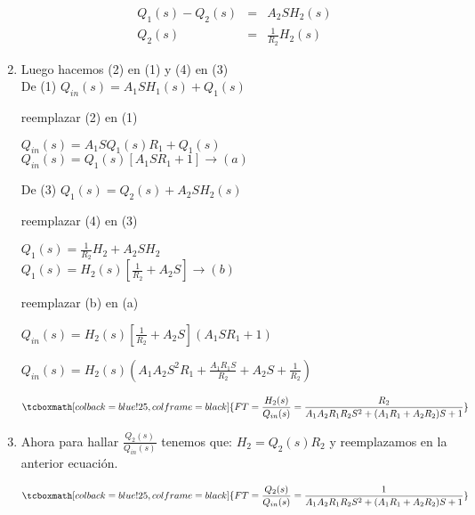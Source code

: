 \documentclass[12pt]{article}
\begin{document}
\begin{enumerate}
    \begin{eqnarray}
      Q_{1}(s) - Q_{2}(s) &=& A_{2}SH_{2}(s) \\[2mm]
      Q_{2}(s) &=& \frac{1}{R_{2}}H_{2}(s)
    \end{eqnarray}

  \item Luego hacemos (2) en (1) y (4) en (3) \\

    De (1) \hspace{5mm} \(\displaystyle Q_{in}(s)=A_{1}SH_{1}(s)+Q_{1}(s)\)

    reemplazar (2) en (1)

   \(\displaystyle Q_{in}(s)=A_{1}SQ_{1}(s)R_{1}+Q_{1}(s)\)\\

   \(\displaystyle Q_{in}(s)=Q_{1}(s)[A_{1}SR_{1}+1] \rightarrow (a)\)

   \vspace{1cm}

   De (3) \hspace{5mm} \(\displaystyle Q_{1}(s)=Q_{2}(s)+A_{2}SH_{2}(s)\)

   reemplazar (4) en (3)

    \(\displaystyle Q_{1}(s)=\frac{1}{R_{2}}H_{2}+A_{2}SH_{2} \)\\

    \(\displaystyle Q_{1}(s)=H_{2}(s) \left[\frac{1}{R_{2}}+A_{2}S \right] \rightarrow (b)\)

    reemplazar (b) en (a)

    \(\displaystyle Q_{in}(s)=H_{2}(s)\left[\frac{1}{R_{2}}+A_{2}S \right](A_{1}SR_{1}+1)\)

    \( \displaystyle Q_{in}(s)=H_{2}(s) \left( A_{1}A_{2}S^{2}R_{1}+\frac{A_{1}R_{1}S}{R_{2}}+A_{2}S+\frac{1}{R_{2}} \right) \)
    
    \begin{eqnarray*}
      \tcboxmath[colback=blue!25,colframe=black]
      {FT=\frac{H_{2}(s)}{Q_{in}(s)}=\frac{R_{2}}{A_{1}A_{2}R_{1}R_{2}S^{2}+(A_{1}R_{1}+A_{2}R_{2})S+1}}
    \end{eqnarray*}

  \item Ahora para hallar \(\frac{Q_{2}(s)}{Q_{in}(s)}\) tenemos que: \(\displaystyle H_{2}=Q_{2}(s)R_{2}\) y reemplazamos en la anterior ecuaci\'on.

    \begin{eqnarray*}
      \tcboxmath[colback=blue!25,colframe=black]
      {FT=\frac{Q_{2}(s)}{Q_{in}(s)}=\frac{1}{A_{1}A_{2}R_{1}R_{2}S^{2}+(A_{1}R_{1}+A_{2}R_{2})S+1}}
    \end{eqnarray*}


\end{enumerate}
\end{document}
